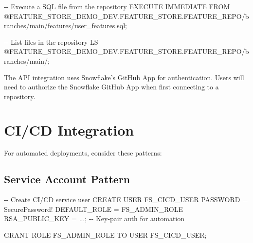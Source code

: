 \documentclass[
  letterpaper,
  DIV=11,
  numbers=noendperiod]{scrreprt}
\newenvironment{Shaded}{\begin{snugshade}}{\end{snugshade}}
\newcommand{\CommentTok}[1]{\textcolor[rgb]{0.37,0.37,0.37}{#1}}
\newcommand{\FunctionTok}[1]{\textcolor[rgb]{0.28,0.35,0.67}{#1}}
\newcommand{\KeywordTok}[1]{\textcolor[rgb]{0.00,0.23,0.31}{#1}}
\newcommand{\NormalTok}[1]{\textcolor[rgb]{0.00,0.23,0.31}{#1}}
\newcommand{\OperatorTok}[1]{\textcolor[rgb]{0.37,0.37,0.37}{#1}}
\newcommand{\StringTok}[1]{\textcolor[rgb]{0.13,0.47,0.30}{#1}}
\begin{document}
\begin{Shaded}
\begin{Highlighting}[]
\CommentTok{{-}{-} Execute a SQL file from the repository}
\KeywordTok{EXECUTE} \KeywordTok{IMMEDIATE} \KeywordTok{FROM}\NormalTok{ @FEATURE\_STORE\_DEMO\_DEV.FEATURE\_STORE.FEATURE\_REPO}\OperatorTok{/}\NormalTok{branches}\OperatorTok{/}\NormalTok{main}\OperatorTok{/}\NormalTok{features}\OperatorTok{/}\NormalTok{user\_features.sql;}

\CommentTok{{-}{-} List files in the repository}
\NormalTok{LS @FEATURE\_STORE\_DEMO\_DEV.FEATURE\_STORE.FEATURE\_REPO}\OperatorTok{/}\NormalTok{branches}\OperatorTok{/}\NormalTok{main}\OperatorTok{/}\NormalTok{;}
\end{Highlighting}
\end{Shaded}

\begin{tcolorbox}[enhanced jigsaw, title=\textcolor{quarto-callout-note-color}{\faInfo}\hspace{0.5em}{GitHub App Authentication}, colbacktitle=quarto-callout-note-color!10!white, rightrule=.15mm, arc=.35mm, colframe=quarto-callout-note-color-frame, left=2mm, bottomtitle=1mm, toptitle=1mm, breakable, bottomrule=.15mm, opacityback=0, titlerule=0mm, toprule=.15mm, opacitybacktitle=0.6, colback=white, coltitle=black, leftrule=.75mm]

The API integration uses Snowflake's GitHub App for authentication.
Users will need to authorize the Snowflake GitHub App when first
connecting to a repository.

\end{tcolorbox}

\hypertarget{cicd-integration}{%
\section{CI/CD Integration}\label{cicd-integration}}

For automated deployments, consider these patterns:

\hypertarget{service-account-pattern}{%
\subsection{Service Account Pattern}\label{service-account-pattern}}

\begin{Shaded}
\begin{Highlighting}[]
\CommentTok{{-}{-} Create CI/CD service user}
\KeywordTok{CREATE} \FunctionTok{USER}\NormalTok{ FS\_CICD\_USER}
    \KeywordTok{PASSWORD} \OperatorTok{=} \StringTok{\textquotesingle{}SecurePassword!\textquotesingle{}}
\NormalTok{    DEFAULT\_ROLE }\OperatorTok{=}\NormalTok{ FS\_ADMIN\_ROLE}
\NormalTok{    RSA\_PUBLIC\_KEY }\OperatorTok{=} \StringTok{\textquotesingle{}...\textquotesingle{}}\NormalTok{;  }\CommentTok{{-}{-} Key{-}pair auth for automation}

\KeywordTok{GRANT} \KeywordTok{ROLE}\NormalTok{ FS\_ADMIN\_ROLE }\KeywordTok{TO} \FunctionTok{USER}\NormalTok{ FS\_CICD\_USER;}
\end{Highlighting}
\end{Shaded}
\end{document}
